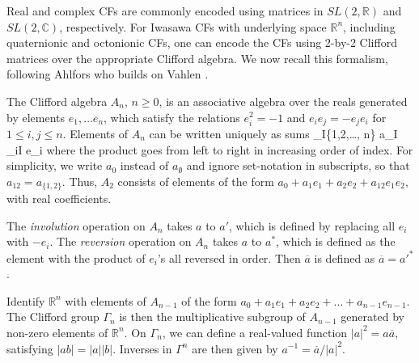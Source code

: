 \documentclass[reqno,10pt]{amsart}
\let\oldalign\align
\let\oldendalign\endalign
\renewenvironment{align}
  {\linenomathNonumbers\oldalign}
  {\oldendalign\endlinenomath}
\def\[#1\]{\begin{linenomath}\begin{align}#1\end{align}\end{linenomath}}
\def\[#1\]{\begin{align}#1\end{align}}
\renewcommand{\C}{\mathbb{C}}
\newcommand{\R}{\mathbb{R}}
\newcommand{\norm}[1]{\left\vert #1 \right \vert}
\numberwithin{thm}{section}
\theoremstyle{definition}
\theoremstyle{definition}
\numberwithin{equation}{section}
\begin{document}
Real and complex CFs are commonly encoded using matrices in $SL(2,\R)$ and $SL(2,\C)$, respectively. For Iwasawa CFs with underlying space $\R^n$, including quaternionic and octonionic CFs, one can encode the CFs using 2-by-2 Clifford matrices over the appropriate Clifford algebra. We now recall this formalism, following Ahlfors \cite{ahlfors1985fixed} who builds on Vahlen \cite{Vahlen1902}.

The Clifford algebra $A_n$, $n\ge 0$, is an associative algebra over the reals generated by elements $e_1, \dots e_n$, which satisfy the relations $e_i^2 =-1$ and $e_ie_j=-e_je_i$ for $1\le i,j\le n$. Elements of $A_n$ can be written uniquely as sums
\[
\sum_{I\subset \{1,2,\dots, n\}} a_I \prod_{i\in I} e_i
\]
where the product goes from left to right in increasing order of index. For simplicity, we write $a_0$ instead of $a_{\emptyset}$ and ignore set-notation in subscripts, so that $a_{12}=a_{\{1,2\}}$. Thus, $A_2$ consists of elements of the form $a_0+a_1e_1+a_2e_2+a_{12}e_1e_2$, with real coefficients. 

The \emph{involution} operation on $A_n$ takes $a$ to $a'$, which is defined by replacing all $e_i$ with $-e_i$. The \emph{reversion} operation on $A_n$ takes $a$ to $a^*$, which is defined as the element with the product of $e_i$'s all reversed in order. Then $\overline{a}$ is defined as $\overline{a}={a'}^*$.

Identify $\R^n$ with elements of $A_{n-1}$ of the form $a_0+a_1e_1+a_2e_2+\dots+a_{n-1}e_{n-1}$.
The Clifford group $\Gamma_n$ is then the multiplicative subgroup of $A_{n-1}$ generated by non-zero elements of $\R^n$. On $\Gamma_n$, we can define a real-valued function $\norm{a}^2=a\overline{a}$, satisfying $\norm{ab}=\norm{a}\norm{b}$. Inverses in $\Gamma^n$ are then given by $a^{-1}=\overline{a}/\norm{a}^2$. 
\end{document}
